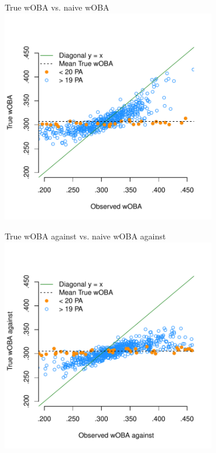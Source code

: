 \documentclass{beamer}
\begin{document}
\begin{frame}{True wOBA vs. naive wOBA}
\centering
\includegraphics[width = 0.7\textwidth]{../figs/true-woba-batters.pdf}
\end{frame}

\begin{frame}{True wOBA against vs. naive wOBA against}
\centering
\includegraphics[width = 0.7\textwidth]{../figs/true-woba-pitchers.pdf}
\end{frame}
\end{document}
